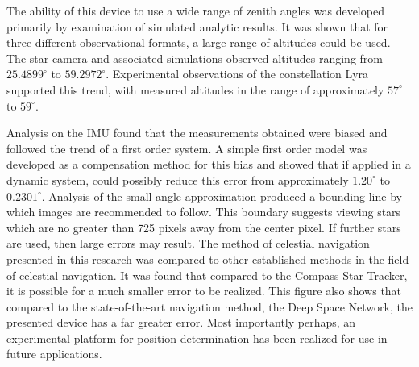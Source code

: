 \documentclass[12pt,a4paper]{book}
\begin{document}
The ability of this device to use a wide range of zenith angles was developed primarily by examination of simulated analytic results.  It was shown that for three different observational formats, a large range of altitudes could be used.   The star camera and associated simulations observed altitudes ranging from $25.4899^{\circ}$ to $59.2972^{\circ}$. Experimental observations of the constellation Lyra supported this trend, with measured altitudes in the range of approximately $57^{\circ}$ to $59^{\circ}$.

Analysis on the IMU found that the measurements obtained were biased and followed the trend of a first order system. A simple first order model was developed as a compensation method for this bias and showed that if applied in a dynamic system, could possibly reduce this error from approximately $1.20^{\circ}$ to $0.2301^{\circ}$. 
Analysis of the small angle approximation produced a bounding line by which images are recommended to follow. This boundary suggests viewing stars which are no greater than 725 pixels away from the center pixel.  If further stars are used, then large errors may result. 
The method of celestial navigation presented in this research was compared to other established methods in the field of celestial navigation.  It was found that compared to the Compass Star Tracker, it is possible for a much smaller error to be realized. This figure also shows that compared to the state-of-the-art navigation method, the Deep Space Network, the presented device has a far greater error.  
Most importantly perhaps, an experimental platform for position determination has been realized for use in future applications.
\end{document}
